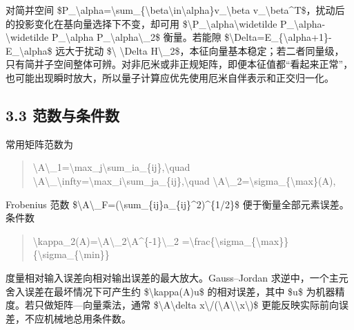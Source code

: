 \documentclass[UTF8,openany,11pt,fontset=fandol]{ctexbook}
\begin{document}
对简并空间
\$P\_\textbackslash alpha=\textbackslash sum\_\{\textbackslash beta\textbackslash in\textbackslash alpha\}v\_\textbackslash beta
v\_\textbackslash beta\^{}T\$，扰动后的投影变化在基向量选择下不变，却可用
\$\textbackslash\textbar P\_\textbackslash alpha\textbackslash widetilde
P\_\textbackslash alpha-\textbackslash widetilde P\_\textbackslash alpha
P\_\textbackslash alpha\textbackslash\textbar\_2\$ 衡量。若能隙
\$\textbackslash Delta=\textbar E\_\{\textbackslash alpha+1\}-E\_\textbackslash alpha\textbar\$
远大于扰动 \$\textbackslash\textbar{} \textbackslash Delta
H\textbackslash\textbar\_2\$，本征向量基本稳定；若二者同量级，只有简并子空间整体可辨。对非厄米或非正规矩阵，即便本征值都``看起来正常''，也可能出现瞬时放大，所以量子计算应优先使用厄米自伴表示和正交归一化。

\subsection{\texorpdfstring{\textbf{3.3
范数与条件数}}{3.3 范数与条件数}}\label{ux8303ux6570ux4e0eux6761ux4ef6ux6570}

常用矩阵范数为

\begin{quote}
\textbackslash\textbar A\textbackslash\textbar\_1=\textbackslash max\_j\textbackslash sum\_i\textbar a\_\{ij\}\textbar,\textbackslash quad
\textbackslash\textbar A\textbackslash\textbar\_\textbackslash infty=\textbackslash max\_i\textbackslash sum\_j\textbar a\_\{ij\}\textbar,\textbackslash quad
\textbackslash\textbar A\textbackslash\textbar\_2=\textbackslash sigma\_\{\textbackslash max\}(A),
\end{quote}

Frobenius 范数
\$\textbackslash\textbar A\textbackslash\textbar\_F=(\textbackslash sum\_\{ij\}\textbar a\_\{ij\}\textbar\^{}2)\^{}\{1/2\}\$
便于衡量全部元素误差。条件数

\begin{quote}
\textbackslash kappa\_2(A)=\textbackslash\textbar A\textbackslash\textbar\_2\textbackslash\textbar A\^{}\{-1\}\textbackslash\textbar\_2
=\textbackslash frac\{\textbackslash sigma\_\{\textbackslash max\}\}\{\textbackslash sigma\_\{\textbackslash min\}\}
\end{quote}

度量相对输入误差向相对输出误差的最大放大。Gauss--Jordan
求逆中，一个主元舍入误差在最坏情况下可产生约
\$\textbackslash kappa(A)u\$ 的相对误差，其中 \$u\$
为机器精度。若只做矩阵---向量乘法，通常
\$\textbackslash\textbar A\textbackslash delta
x\textbackslash\textbar/(\textbackslash\textbar A\textbackslash\textbar\textbackslash\textbar x\textbackslash\textbar)\$
更能反映实际前向误差，不应机械地总用条件数。
\end{document}
